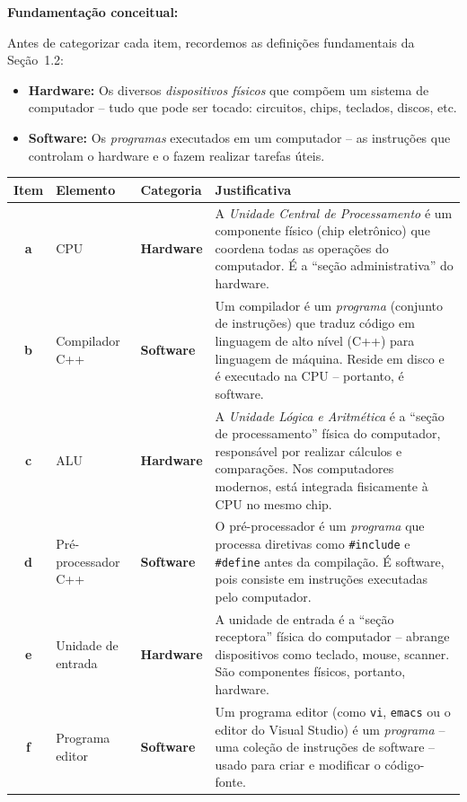 \documentclass[12pt,a4paper]{article}
\begin{document}
\begin{respostabox}

\textbf{Fundamentação conceitual:}

Antes de categorizar cada item, recordemos as definições fundamentais da Seção~1.2:

\begin{itemize}
  \item \textbf{Hardware:} Os diversos \textit{dispositivos físicos} que compõem um sistema
  de computador -- tudo que pode ser tocado: circuitos, chips, teclados, discos, etc.
  \item \textbf{Software:} Os \textit{programas} executados em um computador -- as
  instruções que controlam o hardware e o fazem realizar tarefas úteis.
\end{itemize}

\medskip
\begin{center}
\renewcommand{\arraystretch}{1.5}
\begin{tabular}{>{\bfseries}c l l p{6cm}}
  \toprule
  \textbf{Item} & \textbf{Elemento} & \textbf{Categoria} & \textbf{Justificativa} \\
  \midrule
  a & CPU & \textcolor{deitelblue}{\bfseries Hardware} &
    A \textit{Unidade Central de Processamento} é um componente físico (chip
    eletrônico) que coordena todas as operações do computador. É a ``seção
    administrativa'' do hardware. \\
  \midrule
  b & Compilador C++ & \textcolor{deitellorange}{\bfseries Software} &
    Um compilador é um \textit{programa} (conjunto de instruções) que traduz código
    em linguagem de alto nível (C++) para linguagem de máquina. Reside em disco e
    é executado na CPU -- portanto, é software. \\
  \midrule
  c & ALU & \textcolor{deitelblue}{\bfseries Hardware} &
    A \textit{Unidade Lógica e Aritmética} é a ``seção de processamento'' física do
    computador, responsável por realizar cálculos e comparações. Nos computadores
    modernos, está integrada fisicamente à CPU no mesmo chip. \\
  \midrule
  d & Pré-processador C++ & \textcolor{deitellorange}{\bfseries Software} &
    O pré-processador é um \textit{programa} que processa diretivas como
    \texttt{\#include} e \texttt{\#define} antes da compilação. É software, pois
    consiste em instruções executadas pelo computador. \\
  \midrule
  e & Unidade de entrada & \textcolor{deitelblue}{\bfseries Hardware} &
    A unidade de entrada é a ``seção receptora'' física do computador -- abrange
    dispositivos como teclado, mouse, scanner. São componentes físicos, portanto,
    hardware. \\
  \midrule
  f & Programa editor & \textcolor{deitellorange}{\bfseries Software} &
    Um programa editor (como \texttt{vi}, \texttt{emacs} ou o editor do Visual Studio)
    é um \textit{programa} -- uma coleção de instruções de software -- usado para
    criar e modificar o código-fonte. \\
  \bottomrule
\end{tabular}
\end{center}


\end{respostabox}
\end{document}
